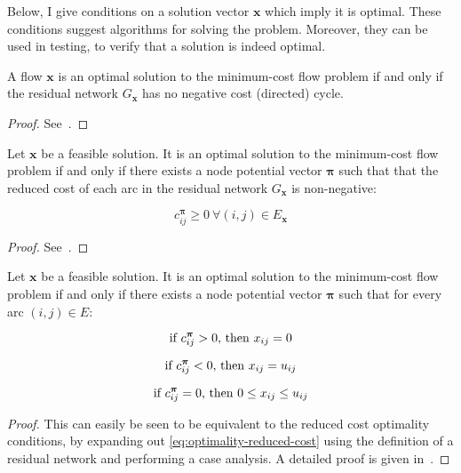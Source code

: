 Below, I give conditions on a solution vector $\mathbf{x}$ which
imply it is optimal. These conditions suggest algorithms for solving
the problem. Moreover, they can be used in testing, to verify that
a solution is indeed optimal.\\

\begin{thm} \label{thm:optimality-neg-cycle}
A flow $\mathbf{x}$ is an optimal solution to the minimum-cost flow problem if and only if the residual network $G_\mathbf{x}$ has no negative cost (directed) cycle.
\end{thm}
\begin{proof}
See~\cite[p.~307]{Ahuja:1993}.
\end{proof}

\begin{thm} \label{thm:optimality-reduced-cost}
Let $\mathbf{x}$ be a feasible solution. It is an optimal solution
to the minimum-cost flow problem if and only if there exists a node
potential vector $\boldsymbol{\pi}$ such that that the reduced cost
of each arc in the residual network $G_{\mathbf{x}}$ is non-negative:

\begin{equation} \label{eq:optimality-reduced-cost}
c_{ij}^{\boldsymbol{\pi}}\geq0\:\forall(i,j)\in E_{\mathbf{x}}
\end{equation}
\end{thm}
\begin{proof}
See~\cite[p.~309]{Ahuja:1993}.
\end{proof}

\begin{thm} \label{thm:optimality-complementary-slackness}
Let $\mathbf{x}$ be a feasible solution. It is an optimal solution
to the minimum-cost flow problem if and only if there exists a node
potential vector $\boldsymbol{\pi}$ such that for every arc $(i,j)\in E$:

\begin{equation}
\text{if \ensuremath{c_{ij}^{\boldsymbol{\pi}}>0}, then \ensuremath{x_{ij}=0}}
\end{equation}

\begin{equation}
\text{if \ensuremath{c_{ij}^{\boldsymbol{\pi}}<0}, then \ensuremath{x_{ij}=u_{ij}}}
\end{equation}

\begin{equation}
\text{if \ensuremath{c_{ij}^{\boldsymbol{\pi}}=0}, then \ensuremath{0\leq x_{ij}\leq u_{ij}}}
\end{equation}
\end{thm}
\begin{proof}
This can easily be seen to be equivalent to the reduced cost optimality conditions, by expanding out \cref{eq:optimality-reduced-cost} using the definition of a residual network and performing a case analysis. A detailed proof is given in~\cite[p.~310]{Ahuja:1993}. 
\end{proof}

